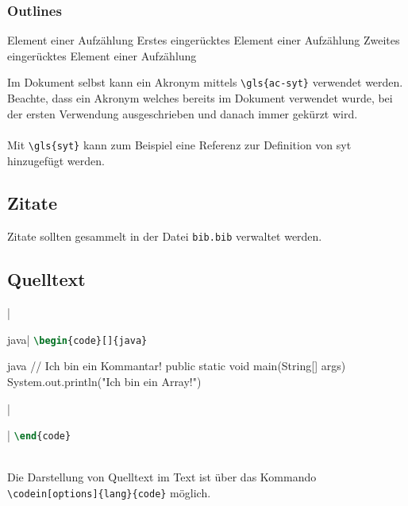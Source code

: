 \subsubsection{Outlines}
\begin{outline}
    \1 Element einer Aufzählung
        \2 Erstes eingerücktes Element einer Aufzählung
        \2 Zweites eingerücktes Element einer Aufzählung
\end{outline}

Im Dokument selbst kann ein Akronym mittels \verb|\gls{ac-syt}| verwendet werden. Beachte, dass ein Akronym welches bereits im Dokument verwendet wurde, bei der ersten Verwendung ausgeschrieben und danach immer gekürzt wird.
\\\\
Mit \verb|\gls{syt}| kann zum Beispiel eine Referenz zur Definition von \gls{syt} hinzugefügt werden.

\subsection{Zitate}
Zitate sollten gesammelt in der Datei \texttt{bib.bib} verwaltet werden.

\newpage
\subsection{Quelltext}
\begin{listing}
\ifminted   {}|\begin{code}[]{java}|    %
\else       \lstinline[numbers=left, language=tex]$\begin{code}[]{java}$\fi
\begin{code}[firstnumber=last]{java}
// Ich bin ein Kommantar!
public static void main(String[] args) {
    System.out.println("Ich bin ein Array!")
}
\end{code}
\ifminted   {}|\end{code}|    %
\else       \lstinline[firstnumber=last, numbers=left, language=tex]$\end{code}$\fi

\caption{Java Code}
\label{lst:java-code}
\end{listing}
~\\
Die Darstellung von Quelltext im Text ist über das Kommando \verb|\codein[options]{lang}{code}| möglich.

